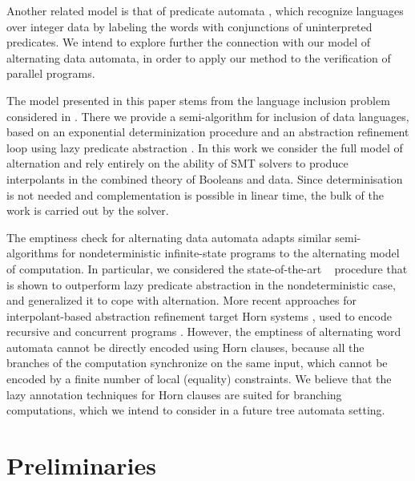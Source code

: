 \documentclass[10pt]{llncs}
\begin{document}

Another related model is that of predicate automata \cite{Farzan15},
which recognize languages over integer data by labeling the words with
conjunctions of uninterpreted predicates. We intend to explore further
the connection with our model of alternating data automata, in order
to apply our method to the verification of parallel programs.

The model presented in this paper stems from the language inclusion
problem considered in \cite{Tacas16}. There we provide a
semi-algorithm for inclusion of data languages, based on an
exponential determinization procedure and an abstraction refinement
loop using lazy predicate abstraction \cite{HJMS02}. In this work we
consider the full model of alternation and rely entirely on the
ability of SMT solvers to produce interpolants in the combined theory
of Booleans and data. Since determinisation is not needed and
complementation is possible in linear time, the bulk of the work is
carried out by the solver. 

The emptiness check for alternating data automata adapts similar
semi-algorithms for nondeterministic infinite-state programs to the
alternating model of computation. In particular, we considered the
state-of-the-art \impact~ procedure \cite{mcmillan06} that is shown to
outperform lazy predicate abstraction \cite{HJMS02} in the
nondeterministic case, and generalized it to cope with
alternation. More recent approaches for interpolant-based abstraction
refinement target Horn systems \cite{McMillan14,Hoder12}, used to
encode recursive and concurrent programs
\cite{Grebenshchikov12}. However, the emptiness of alternating word
automata cannot be directly encoded using Horn clauses, because all
the branches of the computation synchronize on the same input, which
cannot be encoded by a finite number of local (equality)
constraints. We believe that the lazy annotation techniques for Horn
clauses are suited for branching computations, which we intend to
consider in a future tree automata setting.

\section{Preliminaries}
\end{document}
